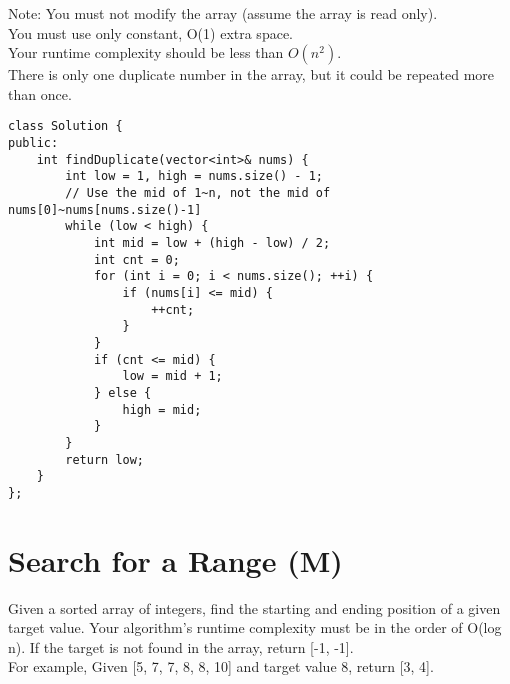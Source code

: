 Note:
    You must not modify the array (assume the array is read only).\\
    You must use only constant, O(1) extra space.\\
    Your runtime complexity should be less than $O(n^2)$.\\
    There is only one duplicate number in the array, but it could be repeated more than once.\\

\begin{lstlisting}
class Solution {
public:
    int findDuplicate(vector<int>& nums) {
        int low = 1, high = nums.size() - 1;
        // Use the mid of 1~n, not the mid of nums[0]~nums[nums.size()-1]
        while (low < high) {
            int mid = low + (high - low) / 2; 
            int cnt = 0;
            for (int i = 0; i < nums.size(); ++i) {
                if (nums[i] <= mid) {
                    ++cnt;
                }
            }
            if (cnt <= mid) {
                low = mid + 1;
            } else {
                high = mid;
            }
        }
        return low;
    }
};
\end{lstlisting}


\section{Search for a Range (M)}
Given a sorted array of integers, find the starting and ending position of a given target value. Your algorithm's runtime complexity must be in the order of O(log n). If the target is not found in the array, return [-1, -1].\\

For example,
Given [5, 7, 7, 8, 8, 10] and target value 8,
return [3, 4]. \\

